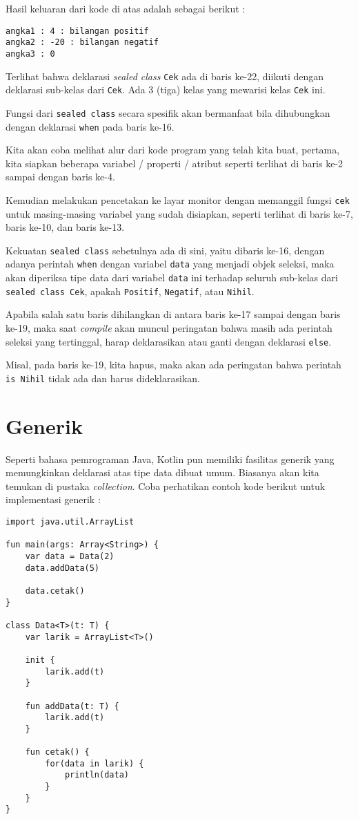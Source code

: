 Hasil keluaran dari kode di atas adalah sebagai berikut :

\begin{lstlisting}
angka1 : 4 : bilangan positif
angka2 : -20 : bilangan negatif
angka3 : 0
\end{lstlisting}

Terlihat bahwa deklarasi \textit{sealed class} \texttt{Cek} ada di baris ke-22, diikuti dengan deklarasi sub-kelas dari \texttt{Cek}. Ada 3 (tiga) kelas yang mewarisi kelas \texttt{Cek} ini.

Fungsi dari \texttt{sealed class} secara spesifik akan bermanfaat bila dihubungkan dengan deklarasi \texttt{when} pada baris ke-16.

Kita akan coba melihat alur dari kode program yang telah kita buat, pertama, kita siapkan beberapa variabel / properti / atribut seperti terlihat di baris ke-2 sampai dengan baris ke-4.

Kemudian melakukan pencetakan ke layar monitor dengan memanggil fungsi \texttt{cek} untuk masing-masing variabel yang sudah disiapkan, seperti terlihat di baris ke-7, baris ke-10, dan baris ke-13.

Kekuatan \texttt{sealed class} sebetulnya ada di sini, yaitu dibaris ke-16, dengan adanya perintah \texttt{when} dengan variabel \texttt{data} yang menjadi objek seleksi, maka akan diperiksa tipe data dari variabel \texttt{data} ini terhadap seluruh sub-kelas dari \texttt{sealed class Cek}, apakah \texttt{Positif}, \texttt{Negatif}, atau \texttt{Nihil}.

Apabila salah satu baris dihilangkan di antara baris ke-17 sampai dengan baris ke-19, maka saat \textit{compile} akan muncul peringatan bahwa masih ada perintah seleksi yang tertinggal, harap deklarasikan atau ganti dengan deklarasi \texttt{else}.

Misal, pada baris ke-19, kita hapus, maka akan ada peringatan bahwa perintah \texttt{is Nihil} tidak ada dan harus dideklarasikan.

\section{Generik}

Seperti bahasa pemrograman Java, Kotlin pun memiliki fasilitas generik yang memungkinkan deklarasi atas tipe data dibuat umum. Biasanya akan kita temukan di pustaka \textit{collection}. Coba perhatikan contoh kode berikut untuk implementasi generik :

\begin{lstlisting}
import java.util.ArrayList

fun main(args: Array<String>) {
	var data = Data(2)
	data.addData(5)
	
	data.cetak()
}

class Data<T>(t: T) {
	var larik = ArrayList<T>()
	
	init {
		larik.add(t)
	}
	
	fun addData(t: T) {
		larik.add(t)
	}
	
	fun cetak() {
		for(data in larik) {
			println(data)
		}
	}
}
\end{lstlisting}

